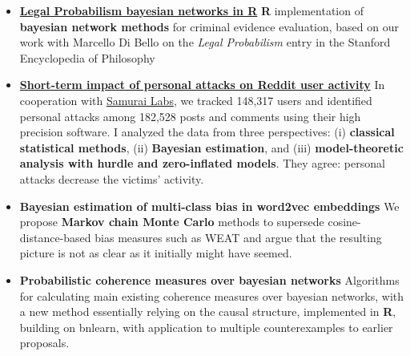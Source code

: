 \documentclass[10pt, a4paper]{article}
\begin{document}
\begin{itemize} [leftmargin=*]
	
	
	
\item 	\href{https://rfl-urbaniak.github.io/LegalProbabilismBNs/}{\textbf{Legal Probabilism bayesian networks in R}} 
 \newline  \scriptsize \textbf{\textsf{R}} implementation  of \textbf{bayesian network methods} for criminal evidence evaluation, based on our work with  Marcello Di Bello on the \newline \emph{Legal  Probabilism} entry in the Stanford Encyclopedia of Philosophy


\normalsize 
\item 	\href{https://rfl-urbaniak.github.io/redditAttacks/}{
	\textbf{Short-term impact of personal attacks on Reddit user  activity}} 
\newline  \scriptsize  In cooperation with \href{https://www.samurailabs.ai/}{Samurai Labs}, we tracked 148,317 users  and identified personal attacks among 182,528 posts and comments  using their high precision software. I  analyzed the data  from three perspectives: (i) \textbf{classical statistical methods}, (ii) \textbf{Bayesian estimation}, and (iii) \textbf{model-theoretic analysis with hurdle and zero-inflated models}. They  agree: personal attacks decrease the victims' activity.

\normalsize 
\item 	%
\textbf{Bayesian estimation of multi-class bias in word2vec embeddings}%
\newline  \scriptsize We  propose \textbf{Markov chain Monte Carlo} methods  to supersede cosine-distance-based bias measures such as WEAT and argue that the resulting picture is not as clear as it initially might have seemed. 



\normalsize 
\item 	%
\textbf{Probabilistic coherence measures over bayesian networks}%
\newline  \scriptsize Algorithms for calculating  main existing coherence measures over bayesian networks, with a new method essentially relying on the causal structure,  implemented in \textbf{\textsf{R}}, building on \textsf{bnlearn}, with application to multiple counterexamples to earlier proposals.





\end{itemize}
\end{document}
